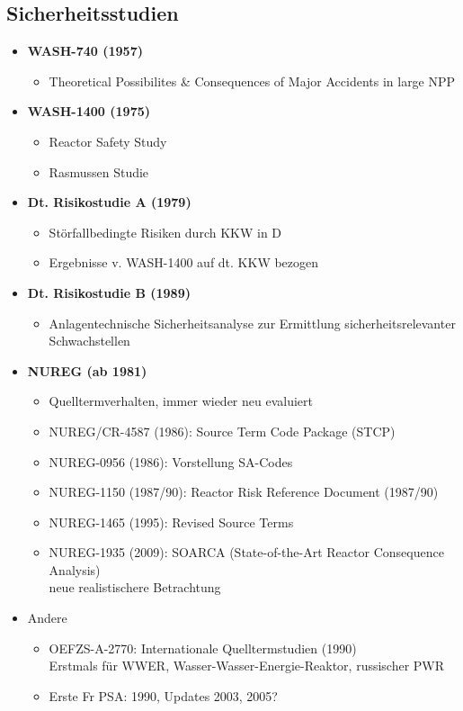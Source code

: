 \documentclass[12pt]{article}
\begin{document}
\subsection{Sicherheitsstudien}
\begin{itemize}[noitemsep]
	\item \textbf{WASH-740 (1957)}
		\begin{itemize}[noitemsep]
			\item Theoretical Possibilites \& Consequences of Major Accidents in large NPP
		\end{itemize}

	\item \textbf{WASH-1400 (1975)}
		\begin{itemize}[noitemsep]
			\item Reactor Safety Study
			\item Rasmussen Studie
		\end{itemize}

	\item \textbf{Dt. Risikostudie A (1979)}
		\begin{itemize}[noitemsep]
			\item Störfallbedingte Risiken durch KKW in D
			\item Ergebnisse v. WASH-1400 auf dt. KKW bezogen
		\end{itemize}

	\item \textbf{Dt. Risikostudie B (1989)}
		\begin{itemize}[noitemsep]
			\item Anlagentechnische Sicherheitsanalyse zur Ermittlung sicherheitsrelevanter Schwachstellen
		\end{itemize}

	\item \textbf{NUREG (ab 1981)}
		\begin{itemize}[noitemsep]
			\item Quelltermverhalten, immer wieder neu evaluiert
			\item NUREG/CR-4587 (1986): Source Term Code Package (STCP)
			\item NUREG-0956 (1986): Vorstellung SA-Codes
			\item NUREG-1150 (1987/90): Reactor Risk Reference Document (1987/90)
			\item NUREG-1465 (1995): Revised Source Terms
			\item NUREG-1935 (2009): SOARCA (State-of-the-Art Reactor Consequence Analysis)\\
				neue realistischere Betrachtung
		\end{itemize}

	\item Andere
		\begin{itemize}[noitemsep]
			\item OEFZS-A-2770: Internationale Quelltermstudien (1990)\\
				Erstmals für WWER, Wasser-Wasser-Energie-Reaktor, russischer PWR
			\item Erste Fr PSA: 1990, Updates 2003, 2005?
		\end{itemize}

\end{itemize}
\end{document}
